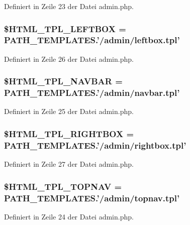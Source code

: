 Definiert in Zeile 23 der Datei admin.php.
\subsubsection{\setlength{\rightskip}{0pt plus 5cm}\$HTML\_\-TPL\_\-LEFTBOX = PATH\_\-TEMPLATES.'/admin/leftbox.tpl'}\label{admin_8php_19d93cdfaed5a4e939eae3d2d5c455af}




Definiert in Zeile 26 der Datei admin.php.
\subsubsection{\setlength{\rightskip}{0pt plus 5cm}\$HTML\_\-TPL\_\-NAVBAR = PATH\_\-TEMPLATES.'/admin/navbar.tpl'}\label{admin_8php_18a0167b7206d323d1c8d556fcd07d8a}




Definiert in Zeile 25 der Datei admin.php.
\subsubsection{\setlength{\rightskip}{0pt plus 5cm}\$HTML\_\-TPL\_\-RIGHTBOX = PATH\_\-TEMPLATES.'/admin/rightbox.tpl'}\label{admin_8php_24423772b2771eb9f4ef63f68843f0ae}




Definiert in Zeile 27 der Datei admin.php.
\subsubsection{\setlength{\rightskip}{0pt plus 5cm}\$HTML\_\-TPL\_\-TOPNAV = PATH\_\-TEMPLATES.'/admin/topnav.tpl'}\label{admin_8php_8e2461f144a2c5abb2918ed49090845d}




Definiert in Zeile 24 der Datei admin.php.
